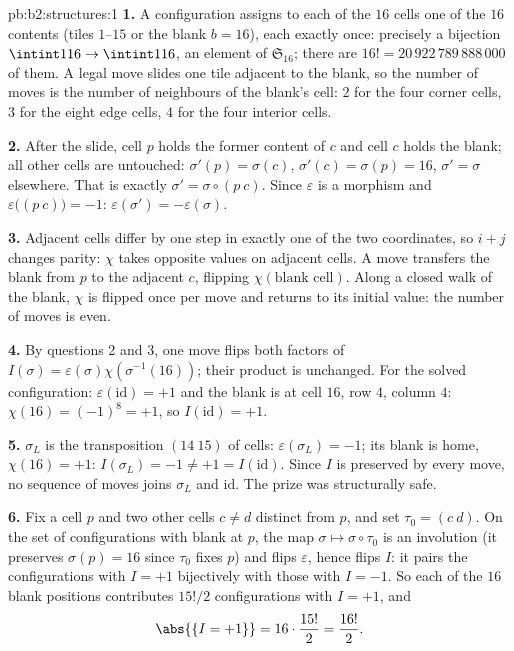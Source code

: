 \begin{solution}{pb:b2:structures:1}
\textbf{1.} A configuration assigns to each of the $16$ cells one
of the $16$ contents (tiles $1$--$15$ or the blank $b = 16$),
each exactly once: precisely a bijection $\intint1{16} \to
\intint1{16}$, an element of $\mathfrak{S}_{16}$; there are $16!
= 20\,922\,789\,888\,000$ of them. A legal move slides one tile
adjacent to the blank, so the number of moves is the number of
neighbours of the blank's cell: $2$ for the four corner cells,
$3$ for the eight edge cells, $4$ for the four interior cells.

\textbf{2.} After the slide, cell $p$ holds the former content of
$c$ and cell $c$ holds the blank; all other cells are untouched:
$\sigma'(p) = \sigma(c)$, $\sigma'(c) = \sigma(p) = 16$,
$\sigma' = \sigma$ elsewhere. That is exactly $\sigma' = \sigma
\circ (p\ c)$. Since $\varepsilon$ is a morphism and
$\varepsilon\bigl((p\ c)\bigr) = -1$:
$\varepsilon(\sigma') = -\varepsilon(\sigma)$.

\textbf{3.} Adjacent cells differ by one step in exactly one of
the two coordinates, so $i + j$ changes parity: $\chi$ takes
opposite values on adjacent cells. A move transfers the blank
from $p$ to the adjacent $c$, flipping $\chi(\text{blank cell})$.
Along a closed walk of the blank, $\chi$ is flipped once per move
and returns to its initial value: the number of moves is even.

\textbf{4.} By questions 2 and 3, one move flips both factors of
$I(\sigma) = \varepsilon(\sigma)\chi(\sigma^{-1}(16))$; their
product is unchanged. For the solved configuration:
$\varepsilon(\mathrm{id}) = +1$ and the blank is at cell $16$,
row $4$, column $4$: $\chi(16) = (-1)^{8} = +1$, so
$I(\mathrm{id}) = +1$.

\textbf{5.} $\sigma_L$ is the transposition $(14\ 15)$ of cells:
$\varepsilon(\sigma_L) = -1$; its blank is home, $\chi(16) = +1$:
$I(\sigma_L) = -1 \neq +1 = I(\mathrm{id})$. Since $I$ is
preserved by every move, no sequence of moves joins $\sigma_L$
and $\mathrm{id}$. The prize was structurally safe.

\textbf{6.} Fix a cell $p$ and two other cells $c \neq d$
distinct from $p$, and set $\tau_0 = (c\ d)$. On the set of
configurations with blank at $p$, the map $\sigma \mapsto \sigma
\circ \tau_0$ is an involution (it preserves $\sigma(p) = 16$
since $\tau_0$ fixes $p$) and flips $\varepsilon$, hence flips
$I$: it pairs the configurations with $I = +1$ bijectively with
those with $I = -1$. So each of the $16$ blank positions
contributes $15!/2$ configurations with $I = +1$, and
\[
\abs{\{I = +1\}} = 16 \cdot \frac{15!}{2} = \frac{16!}{2}.
\]


\end{solution}
